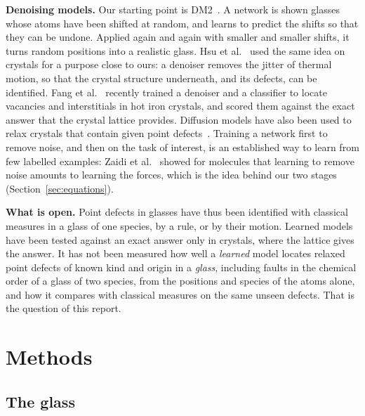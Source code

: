 \documentclass[10pt]{article}
\begin{document}
\textbf{Denoising models.} Our starting point is DM2~\citep{yang2026dm2}. A network is shown glasses whose atoms have been shifted at random, and learns to predict the shifts so that they can be undone. Applied again and again with smaller and smaller shifts, it turns random positions into a realistic glass. Hsu et al.~\citep{hsu2024denoising} used the same idea on crystals for a purpose close to ours: a denoiser removes the jitter of thermal motion, so that the crystal structure underneath, and its defects, can be identified. Fang et al.~\citep{fang2026} recently trained a denoiser and a classifier to locate vacancies and interstitials in hot iron crystals, and scored them against the exact answer that the crystal lattice provides. Diffusion models have also been used to relax crystals that contain given point defects~\citep{cui2026constrained}. Training a network first to remove noise, and then on the task of interest, is an established way to learn from few labelled examples: Zaidi et al.~\citep{zaidi2023} showed for molecules that learning to remove noise amounts to learning the forces, which is the idea behind our two stages (Section~\ref{sec:equations}).

\textbf{What is open.} Point defects in glasses have thus been identified with classical measures in a glass of one species, by a rule, or by their motion. Learned models have been tested against an exact answer only in crystals, where the lattice gives the answer. It has not been measured how well a \emph{learned} model locates relaxed point defects of known kind and origin in a \emph{glass}, including faults in the chemical order of a glass of two species, from the positions and species of the atoms alone, and how it compares with classical measures on the same unseen defects. That is the question of this report.

\section{Methods}

\subsection{The glass}
\end{document}
